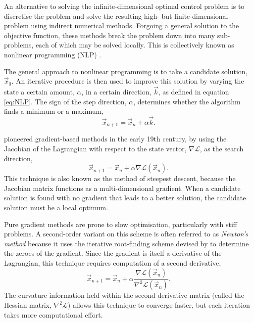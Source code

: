 An alternative to solving the infinite-dimensional optimal control problem is to discretise the problem and solve the resulting high- but finite-dimensional problem using indirect numerical methods. Forgoing a general solution to the objective function, these methods break the problem down into many sub-problems, each of which may be solved locally. This is collectively known as nonlinear programming (NLP) \parencite{Stryck1992}. 

The general approach to nonlinear programming is to take a candidate solution, $\vec{x}_0$. An iterative procedure is then used to improve this solution by varying the state a certain amount, $\alpha$, in a certain direction, $\vec{k}$, as defined in equation \eqref{eq:NLP}. The sign of the step direction, $\alpha$, determines whether the algorithm finds a minimum or a maximum,
\begin{equation} \label{eq:NLP}
\vec{x}_{n+1}=\vec{x}_n+\alpha\vec{k}.
\end{equation}

\textcite{Gauss1827} pioneered gradient-based methods in the early 19th century, by using the Jacobian of the Lagrangian with respect to the state vector, $\nabla\mathcal{L}$, as the search direction,
\begin{equation} \label{eq:gradient-method}
\vec{x}_{n+1}=\vec{x}_n + \alpha\nabla\mathcal{L}(\vec{x}_n).
\end{equation}
This technique is also known as the method of steepest descent, because the Jacobian matrix functions as a multi-dimensional gradient. When a candidate solution is found with no gradient that leads to a better solution, the candidate solution must be a local optimum.

Pure gradient methods are prone to slow optimisation, particularly with stiff problems. %
A second-order variant on this scheme is often referred to as \emph{Newton's method} because it uses the iterative root-finding scheme devised by \textcite{Newton1711, Newton1736} to determine the zeroes of the gradient. Since the gradient is itself a derivative of the Lagrangian, this technique requires computation of a second derivative, 
\begin{equation} \label{eq:newtons-method}
\vec{x}_{n+1}=\vec{x}_n + \alpha\frac{\nabla\mathcal{L}(\vec{x}_n)}{\nabla^2\mathcal{L}(\vec{x}_n)}.
\end{equation}
The curvature information held within the second derivative matrix (called the Hessian matrix, $\nabla^2\mathcal{L}$) allows this technique to converge faster, but each iteration takes more computational effort.

